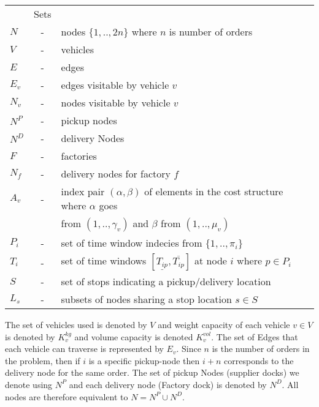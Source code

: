 \documentclass[a4paper,10pt]{article}
\begin{document}
\begin{tabular}{l c l }
              &Sets 					        	\\ 
    $N      $ &-& nodes $\{1,..,2n\}$ where $n$ is number of orders     \\
    $V      $ &-& vehicles  					        \\
    $E      $ &-& edges 					        \\
    $E_v    $ &-& edges visitable by vehicle $v$ 		        \\
    $N_v    $ &-& nodes visitable by vehicle $v$  		        \\
    $N^P    $ &-& pickup nodes 					        \\
    $N^D    $ &-& delivery Nodes 				        \\
    $F      $ &-& factories 					        \\
    $N_f    $ &-& delivery nodes for factory $f$ 		        \\
    $A_v    $ &-& index pair $(\alpha,\beta)$ of elements in the cost 
                  structure where $\alpha$ goes                         \\
              & & from $(1,..,\gamma_v)$ and $\beta$ from $(1,..,\mu_v)$\\
    $P_i    $ &-& set of time window indecies from $\{1,..,\pi_i\}$     \\
    $T_{i}  $ &-& set of time windows $[ \underline{T_{ip}},  
		  \overline{T_{ip}} ]$ at node $i$ where $p \in P_i$	\\
    $S      $ &-& set of stops indicating a pickup/delivery location    \\
    $L_s    $ &-& subsets of nodes sharing a stop location 
                  $s \in S$ 	                                        \\
\end{tabular}
\linebreak
\linebreak
\par
The set of vehicles used is denoted by $V$ and weight capacity of each vehicle $v \in V$ is denoted by $K_v^{kg}$ and volume capacity is denoted $K_v^{vol}$.
The set of Edges that each vehicle can traverse is represented by $E_v$. 
Since $n$ is the number of orders in the problem, then if $i$ is a specific pickup-node then $i+n$ corresponds to the delivery node for the same order.
The set of pickup Nodes (supplier docks) we denote using $N^P$ and each delivery node (Factory dock) is denoted by $N^D$. 
All nodes are therefore equivalent to $N = N^P \cup N^D$. 
\end{document}
